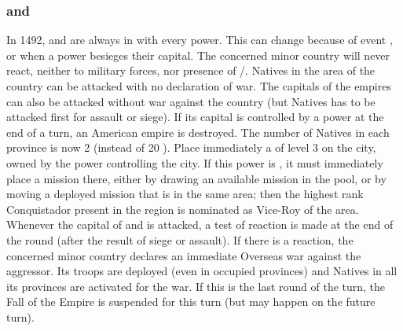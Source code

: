 \subsubsection{ and }\label{chDiplo:Diplo-inca}\label{chDiplo:Diplo-azteque}
In 1492,  and  are always in \dipAT with every
power.  This can change because of event , or when a power besieges their capital.
\bparag The concerned minor country will never react, neither to
military forces, nor presence of \TP/\COL.
\bparag Natives in the area of the country can be attacked with no
declaration of war. The capitals of the empires can also be attacked
without war against the country (but Natives has to be attacked first
for assault or siege).
\bparag If its capital is controlled by a power at the end of a turn, an
American empire is destroyed. The number of Natives in each province is
now 2 \LD (instead of 20 \LD).
\bparag Place immediately a \COL of level 3 on the city, owned by the
power controlling the city. If this power is \SPA, it must immediately
place a mission there, either by drawing an available mission in the
pool, or by moving a deployed mission that is in the same area; then the
highest rank Conquistador present in the region is nominated as Vice-Roy
of the area.
Whenever the capital of  and  is attacked, a
test of reaction is made at the end of the round (after the result of
siege or assault). If there is a reaction, the concerned minor country
declares an immediate Overseas war against the aggressor.
\bparag Its troops are deployed (even in occupied provinces) and Natives
in all its provinces are activated for the war.
\bparag If this is the last round of the turn, the Fall of the Empire is
suspended for this turn (but may happen on the future turn).

